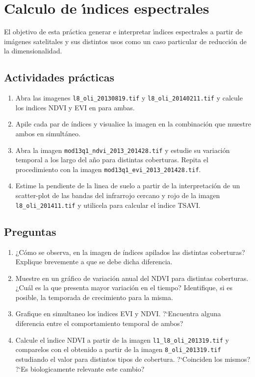 \documentclass[hidelinks,12pt]{article}
\begin{document}
\section{Calculo de \'{\i}ndices espectrales}
El objetivo de esta práctica generar e interpretar \'{\i}ndices espectrales
a partir de  imágenes satelitales y sus distintos usos como un caso
particular de reducci\'on de la dimensionalidad.

\subsection{Actividades pr\'acticas}
\begin{enumerate}
    \item Abra las imagenes \texttt{l8\_oli\_20130819.tif} y 
        \texttt{l8\_oli\_20140211.tif} y calcule los indices NDVI y EVI en 
        para ambas.
    \item Apile cada par de  índices y visualice la imagen en la combinación que 
        muestre ambos en simultáneo.
    \item Abra la imagen \texttt{mod13q1\_ndvi\_2013\_2014\-28.tif} y 
        estudie su variaci\'on temporal a los largo del a\~no para distintas 
        coberturas. Repita el procedimiento con la imagen 
        \texttt{mod13q1\_evi\_2013\_2014\-28.tif}.
    \item Estime la pendiente de la linea de suelo a partir de la
        interpretaci\'on de un scatter-plot de las bandas del infrarrojo cercano
        y rojo de la imagen \texttt{l8\_oli\_2014\-11.tif} y utilicela para
        calcular el \'{\i}ndice TSAVI\@.
\end{enumerate}

\subsection{Preguntas}
\begin{enumerate}
    \item ¿Cómo se observa, en la imagen de índices apilados las distintas
        coberturas? Explique brevemente a que se debe dicha diferencia.
    \item Muestre en un gráfico de variación anual del NDVI para distintas coberturas.
        ¿Cuál es la que presenta mayor variaci\'on en el tiempo? Identifique, si es
        posible, la temporada de crecimiento para la misma.
    \item Grafique en simultaneo los \'{\i}ndices EVI y NDVI. ?`Encuentra alguna
        diferencia entre el comportamiento temporal de ambos? 
    \item Calcule el \'{\i}ndice NDVI a partir de la imagen
        \texttt{l1\_l8\_oli\_2013\-19.tif}
        y comparelos con el obtenido a partir de la
        imagen \texttt{8\_oli\_2013\-19.tif} estudiando el valor para distintos
        tipos de cobertura. ?`Coinciden los mismos? ?`Es biologicamente relevante
        este cambio?
\end{enumerate}
\newpage
\end{document}
